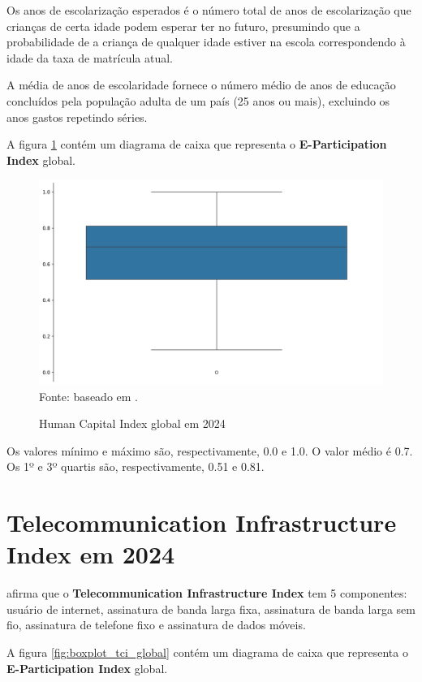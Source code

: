 Os anos de escolarização esperados é o número total de anos de escolarização que crianças de certa idade podem esperar ter no futuro, presumindo que a probabilidade de a criança de qualquer idade estiver na escola correspondendo à idade da taxa de matrícula atual.

A média de anos de escolaridade fornece o número médio de anos de educação concluídos pela população adulta de um país (25 anos ou mais), excluindo os anos gastos repetindo séries. 

A figura \ref{fig:boxplot_hci_global} contém um diagrama de caixa que representa o \textbf{E-Participation Index} global.

\begin{figure}[H]
	\centering
	\caption{Human Capital Index global em 2024}
	\includegraphics[width=1\linewidth]{figuras/egdi/boxplot_hci_global.png}
	\label{fig:boxplot_hci_global}
	\footnotesize{Fonte: baseado em \cite{ONU_EGDI_mapa}.}
\end{figure}

Os valores mínimo e máximo são, respectivamente, 0.0 e 1.0. O  valor médio é 0.7. Os 1º e 3º quartis são, respectivamente, 0.51 e 0.81.

\section{Telecommunication Infrastructure Index em 2024}
\label{tii}

\cite{ONU_EGDI_methodology} afirma que o \textbf{Telecommunication Infrastructure Index} tem 5 componentes: usuário de internet, assinatura de banda larga fixa, assinatura de banda larga sem fio, assinatura de telefone fixo e assinatura de dados móveis.

A figura \ref{fig:boxplot_tci_global} contém um diagrama de caixa que representa o \textbf{E-Participation Index} global.

